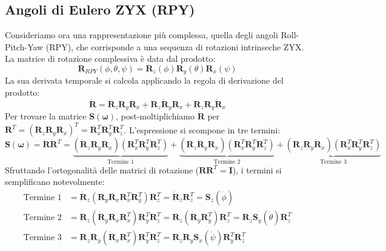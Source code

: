﻿\documentclass[11pt, a4paper]{article}
\begin{document}
\subsection{Angoli di Eulero ZYX (RPY)}
Consideriamo ora una rappresentazione più complessa, quella degli angoli Roll-Pitch-Yaw (RPY), che corrisponde a una sequenza di rotazioni intrinseche ZYX. La matrice di rotazione complessiva è data dal prodotto:
\[
    \bm{R}_{RPY}(\phi, \theta, \psi) = \bm{R}_z(\phi)\bm{R}_y(\theta)\bm{R}_x(\psi)
\]
La sua derivata temporale si calcola applicando la regola di derivazione del prodotto:
\[
    \dot{\bm{R}} = \dot{\bm{R}}_z\bm{R}_y\bm{R}_x + \bm{R}_z\dot{\bm{R}}_y\bm{R}_x + \bm{R}_z\bm{R}_y\dot{\bm{R}}_x
\]
Per trovare la matrice \(\bm{S}(\bm{\omega})\), post-moltiplichiamo \(\dot{\bm{R}}\) per \(\bm{R}^T = (\bm{R}_z\bm{R}_y\bm{R}_x)^T = \bm{R}_x^T\bm{R}_y^T\bm{R}_z^T\). L'espressione si scompone in tre termini:
\[
    \bm{S}(\bm{\omega}) = \dot{\bm{R}}\bm{R}^T =
    \underbrace{(\dot{\bm{R}}_z\bm{R}_y\bm{R}_x)(\bm{R}_x^T\bm{R}_y^T\bm{R}_z^T)}_{\text{Termine 1}} +
    \underbrace{(\bm{R}_z\dot{\bm{R}}_y\bm{R}_x)(\bm{R}_x^T\bm{R}_y^T\bm{R}_z^T)}_{\text{Termine 2}} +
    \underbrace{(\bm{R}_z\bm{R}_y\dot{\bm{R}}_x)(\bm{R}_x^T\bm{R}_y^T\bm{R}_z^T)}_{\text{Termine 3}}
\]
Sfruttando l'ortogonalità delle matrici di rotazione (\(\bm{R}\bm{R}^T = \bm{I}\)), i termini si semplificano notevolmente:
\begin{align*}
    \text{Termine 1} &= \dot{\bm{R}}_z (\bm{R}_y\bm{R}_x\bm{R}_x^T\bm{R}_y^T) \bm{R}_z^T = \dot{\bm{R}}_z\bm{R}_z^T = \bm{S}_z(\dot{\phi}) \\
    \text{Termine 2} &= \bm{R}_z (\dot{\bm{R}}_y\bm{R}_x\bm{R}_x^T) \bm{R}_y^T\bm{R}_z^T = \bm{R}_z(\dot{\bm{R}}_y\bm{R}_y^T)\bm{R}_z^T = \bm{R}_z \bm{S}_y(\dot{\theta}) \bm{R}_z^T \\
    \text{Termine 3} &= \bm{R}_z\bm{R}_y(\dot{\bm{R}}_x\bm{R}_x^T)\bm{R}_y^T\bm{R}_z^T = \bm{R}_z\bm{R}_y \bm{S}_x(\dot{\psi}) \bm{R}_y^T\bm{R}_z^T
\end{align*}
\end{document}

